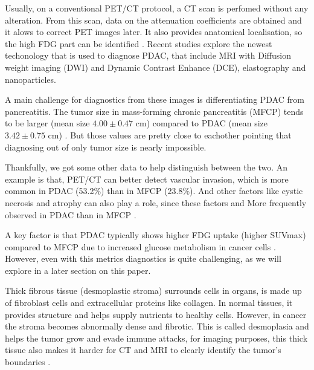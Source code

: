 \documentclass[11pt]{article} %
\begin{document}
Usually, on a conventional PET/CT protocol, a CT scan is perfomed without any alteration. From this scan, data on the attenuation coefficients are obtained and it alows to correct PET images later. It also provides anatomical localisation, so the high FDG part can be identified \cite{benamor2007petct}. Recent studies explore the newest techonology that is used to diagnose PDAC, that include MRI with Diffusion weight imaging (DWI) and Dynamic Contrast Enhance (DCE), elastography and nanoparticles. \cite{Cancers2023}


A main challenge for diagnostics from these images is differentiating PDAC from pancreatitis. The tumor size in mass-forming chronic pancreatitis (MFCP) tends to be larger (mean size $4.00±0.47$ cm) compared to PDAC (mean size $3.42±0.75$ cm) \cite{arnone2020}. But those values are pretty close to eachother pointing that diagnosing out of only tumor size is nearly impossible. 

Thankfully, we got some other data to help distinguish between the two. An example is that, PET/CT can better detect vascular invasion, which is more common in PDAC (53.2\%) than in MFCP (23.8\%). And other factors like cystic necrosis and atrophy can also play a role, since these factors and More frequently observed in PDAC than in MFCP \cite{arnone2020}. 

A key factor is that PDAC typically shows higher FDG uptake (higher SUVmax) compared to MFCP due to increased glucose metabolism in cancer cells \cite{arnone2020,Pu2021}. However, even with this metrics diagnostics is quite challenging, as we will explore in a later section on this paper.



Thick fibrous tissue (desmoplastic stroma) surrounds cells in organs, is made up of fibroblast cells and extracellular proteins like collagen. In normal tissues, it provides structure and helps supply nutrients to healthy cells. However, in cancer the stroma becomes abnormally dense and fibrotic. This is called desmoplasia and helps the tumor grow and evade immune attacks, for imaging purposes, this thick tissue also makes it harder for CT and MRI to clearly identify the tumor's boundaries \cite{NCCNGuidelines}.
\end{document}

